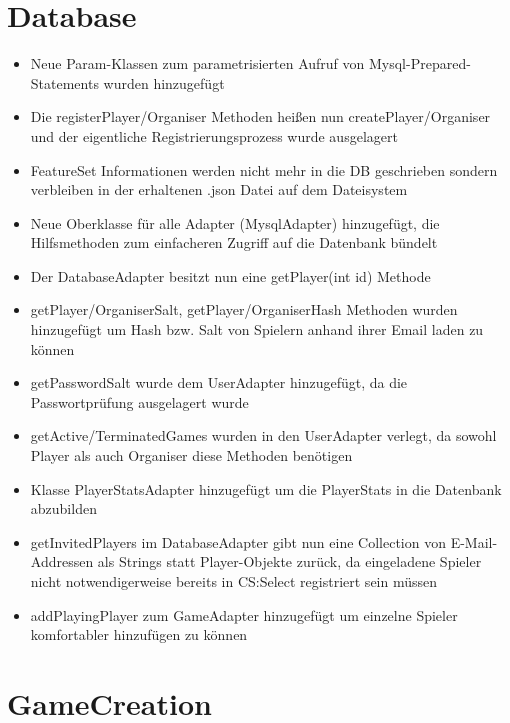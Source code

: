 \documentclass[a4paper]{scrreprt}
\begin{document}
\section{Database}
\begin{itemize}
    \item Neue Param-Klassen zum parametrisierten Aufruf von Mysql-Prepared-Statements wurden hinzugefügt
    \item Die registerPlayer/Organiser Methoden heißen nun createPlayer/Organiser und der eigentliche Registrierungsprozess wurde ausgelagert
    \item FeatureSet Informationen werden nicht mehr in die DB geschrieben sondern verbleiben in der erhaltenen .json Datei auf dem Dateisystem
    \item Neue Oberklasse für alle Adapter (MysqlAdapter) hinzugefügt, die Hilfsmethoden zum einfacheren Zugriff auf die Datenbank bündelt
    \item Der DatabaseAdapter besitzt nun eine getPlayer(int id) Methode
    \item getPlayer/OrganiserSalt, getPlayer/OrganiserHash Methoden wurden hinzugefügt um Hash bzw. Salt von Spielern anhand ihrer Email laden zu können
    \item getPasswordSalt wurde dem UserAdapter hinzugefügt, da die Passwortprüfung ausgelagert wurde
    \item getActive/TerminatedGames wurden in den UserAdapter verlegt, da sowohl Player als auch Organiser diese Methoden benötigen
    \item Klasse PlayerStatsAdapter hinzugefügt um die PlayerStats in die Datenbank abzubilden
    \item getInvitedPlayers im DatabaseAdapter gibt nun eine Collection von E-Mail-Addressen als Strings statt Player-Objekte zurück, da eingeladene Spieler nicht notwendigerweise bereits in CS:Select registriert sein müssen
    \item addPlayingPlayer zum GameAdapter hinzugefügt um einzelne Spieler komfortabler hinzufügen zu können
\end{itemize}

\section{GameCreation}
\end{document}
